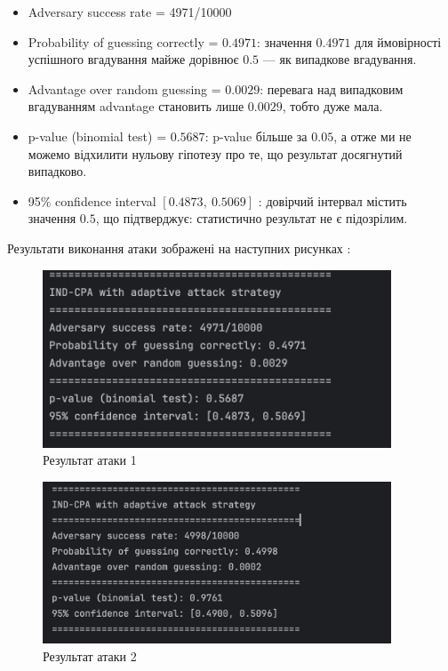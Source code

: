 \begin{itemize}
    \item Adversary success rate = 4971/10000
    \item Probability of guessing correctly =  $0.4971$: значення $0.4971$ для ймовірності успішного вгадування майже дорівнює $0.5$ — як випадкове вгадування.
    \item Advantage over random guessing = $0.0029$: перевага над випадковим вгадуванням advantage становить лише $0.0029$, тобто дуже мала.
    \item p-value (binomial test) =  $0.5687$: p-value більше за $0.05$, а отже ми не можемо відхилити нульову гіпотезу про те, що результат досягнутий випадково.
    \item 95\% confidence interval $[0.4873,\ 0.5069]$ : довірчий інтервал містить значення $0.5$, що підтверджує: статистично результат не є підозрілим.
\end{itemize}

Результати виконання атаки зображені на наступних рисунках : 

\begin{figure}[h]
    \centering
    \includegraphics[width=0.925\textwidth]{ПРАКТИКА/Images/IND_CPA_1.jpg}
    \caption{Результат атаки 1}
    \label{fig:ind_cpa_1}
\end{figure}

\begin{figure}[h]
    \centering
    \includegraphics[width=0.925\textwidth]{ПРАКТИКА/Images/IND_CPA_2.jpg}
    \caption{Результат атаки 2}
    \label{fig:ind_cpa_2}
\end{figure}


